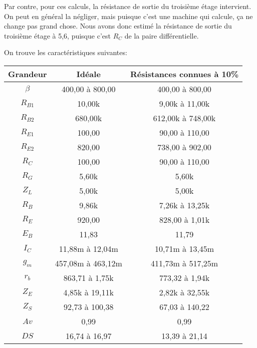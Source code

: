     Par contre, pour ces calculs, la résistance de sortie du troisième étage intervient.
    On peut en général la négliger, mais puisque c’est une machine qui calcule, ça ne
    change pas grand chose. Nous avons donc estimé la résistance de sortie du troisième
    étage à 5,6\kilo\ohm, puisque c’est $R_C$ de la paire différentielle.

   On trouve les caractéristiques suivantes:

   \begin{tabular}{|c|c|c|}
    \hline
     Grandeur  & Idéale           &   Résistances connues à 10\% \\\hline
     $\beta$     & 400,00 à 800,00 & 400,00 à 800,00 \\\hline
     $R_{B1}$   &      10,00k      & 9,00k à 11,00k  \\\hline
     $R_{B2}$   &     680,00k      &612,00k à 748,00k\\\hline
     $R_{E1}$   &      100,00      & 90,00 à 110,00  \\\hline
     $R_{E2}$   &      820,00      & 738,00 à 902,00 \\\hline
     $R_C$       &      100,00      & 90,00 à 110,00  \\\hline
     $R_G$       &      5,60k       &      5,60k       \\\hline
     $Z_L$       &      5,00k       &      5,00k       \\\hline
     $R_B$       &      9,86k       & 7,26k à 13,25k  \\\hline
     $R_E$       &      920,00      & 828,00 à 1,01k  \\\hline
     $E_B$       &      11,83       &      11,79       \\\hline
     $I_C$       & 11,88m à 12,04m & 10,71m à 13,45m \\\hline
     $g_m$       &457,08m à 463,12m&411,73m à 517,25m\\\hline
     $r_b$       & 863,71 à 1,75k  & 773,32 à 1,94k  \\\hline
     $Z_E$       & 4,85k à 19,11k  & 2,82k à 32,55k  \\\hline
     $Z_S$       & 92,73 à 100,38  & 67,03 à 140,22  \\\hline
     $Av$        &       0,99       &       0,99       \\\hline
     $DS$         &  16,74 à 16,97  &  13,39 à 21,14  \\\hline
  \end{tabular}


